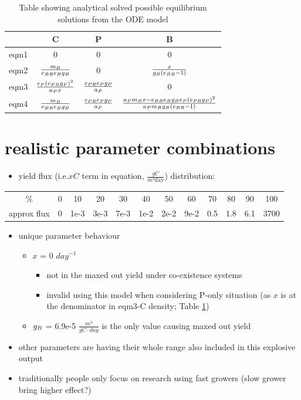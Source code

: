 \documentclass[../thesis.tex]{subfiles} %
\begin{document}
\begin{table}[H]
    \centering
    \caption{Table showing analytical solved possible equilibrium solutions from the ODE model}
    \begin{tabular}{c|ccc}\hline
        & C & P & B\\\hline
        eqm1 & 0 & 0 & 0\\
        eqm2 & $\frac{m_B}{e_{BR}e_Bg_B}$ & 0 & $\frac{x}{g_B(e_{BR}-1)}$\\
        eqm3 & $\frac{e_P(e_{PR}g_P)^2}{a_P x}$ & $\frac{e_{PR}e_Pg_P}{a_P}$ & 0\\
        eqm4 & $\frac{m_B}{e_{BR}e_Bg_B}$ & $\frac{e_{PR}e_Pg_P}{a_P}$ & $\frac{a_Pm_B x-e_{BR}e_Bg_Be_P(e_{PR}g_P)^2}{a_Pm_Bg_B(e_{BR}-1)}$\\\hline
    \end{tabular}
    \label{tab:anaSol}
\end{table}

\section{realistic parameter combinations}
\begin{itemize}
    \item yield flux (i.e.$xC$ term in equation, $\frac{gC}{m^3\text{day}}$) distribution:
\end{itemize}
\begin{center}
    \begin{tabular}{c|ccccccccccc}\hline
        \% & 0 & 10 & 20 & 30 & 40 & 50 & 60 & 70 & 80 & 90 & 100\\
        approx flux & 0 & 1e-3 & 3e-3 & 7e-3 & 1e-2 & 2e-2 & 9e-2 & 0.5 & 1.8 & 6.1 & 3700\\\hline
    \end{tabular}
\end{center}
\begin{itemize}
    \item unique parameter behaviour
    \begin{itemize}
        \item $x$ = 0 $day^{-1}$
        \begin{itemize}
            \item not in the maxed out yield under co-existence systems
            \item invalid using this model when considering P-only situation (as $x$ is at the denominator in eqm3-C density; Table \ref{tab:anaSol})
        \end{itemize}
        \item $g_B$ = 6.9e-5 $\frac{m^3}{gC\cdot day}$ is the only value causing maxed out yield
    \end{itemize}
    \item other parameters are having their whole range also included in this explosive output
    \item traditionally people only focus on research using fast growers (slow grower bring higher effect?)
\end{itemize}
\end{document}
